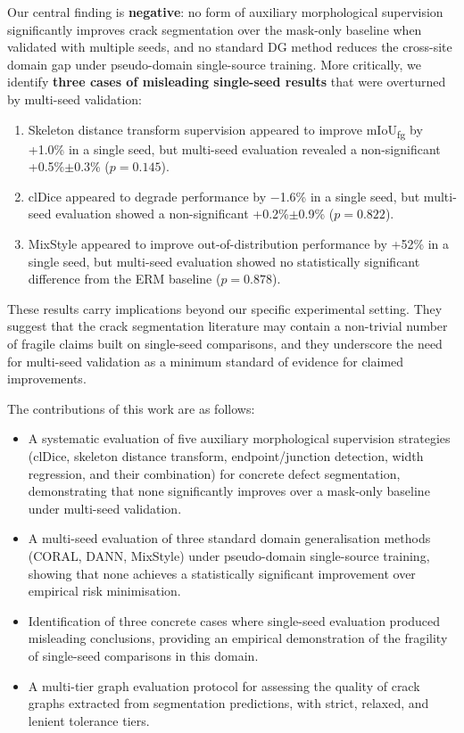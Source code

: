 Our central finding is \textbf{negative}: no form of auxiliary morphological supervision significantly improves crack segmentation over the mask-only baseline when validated with multiple seeds, and no standard DG method reduces the cross-site domain gap under pseudo-domain single-source training. More critically, we identify \textbf{three cases of misleading single-seed results} that were overturned by multi-seed validation:
\begin{enumerate}
    \item Skeleton distance transform supervision appeared to improve mIoU\textsubscript{fg} by +1.0\% in a single seed, but multi-seed evaluation revealed a non-significant +0.5\%$\pm$0.3\% ($p=0.145$).
    \item clDice appeared to degrade performance by $-$1.6\% in a single seed, but multi-seed evaluation showed a non-significant +0.2\%$\pm$0.9\% ($p=0.822$).
    \item MixStyle appeared to improve out-of-distribution performance by +52\% in a single seed, but multi-seed evaluation showed no statistically significant difference from the ERM baseline ($p=0.878$).
\end{enumerate}

These results carry implications beyond our specific experimental setting. They suggest that the crack segmentation literature may contain a non-trivial number of fragile claims built on single-seed comparisons, and they underscore the need for multi-seed validation as a minimum standard of evidence for claimed improvements.

The contributions of this work are as follows:
\begin{itemize}
    \item A systematic evaluation of five auxiliary morphological supervision strategies (clDice, skeleton distance transform, endpoint/junction detection, width regression, and their combination) for concrete defect segmentation, demonstrating that none significantly improves over a mask-only baseline under multi-seed validation.
    \item A multi-seed evaluation of three standard domain generalisation methods (CORAL, DANN, MixStyle) under pseudo-domain single-source training, showing that none achieves a statistically significant improvement over empirical risk minimisation.
    \item Identification of three concrete cases where single-seed evaluation produced misleading conclusions, providing an empirical demonstration of the fragility of single-seed comparisons in this domain.
    \item A multi-tier graph evaluation protocol for assessing the quality of crack graphs extracted from segmentation predictions, with strict, relaxed, and lenient tolerance tiers.
\end{itemize}


